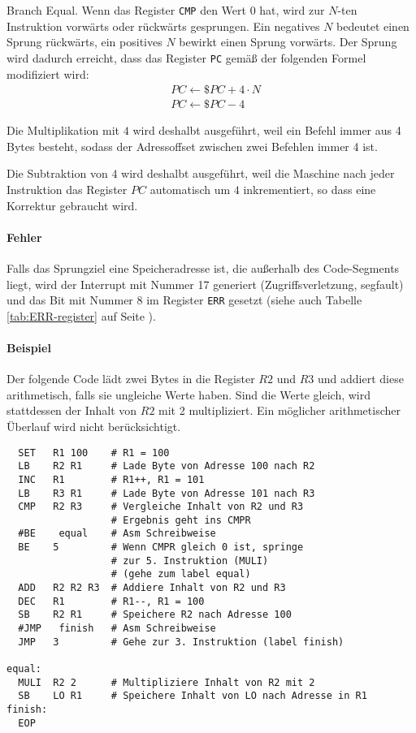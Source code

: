 \glqq Branch Equal\grqq.
Wenn das Register \texttt{CMP} den Wert $0$ hat, wird zur $N$-ten Instruktion
vorwärts oder rückwärts gesprungen. Ein negatives $N$ bedeutet einen Sprung
rückwärts, ein positives $N$ bewirkt einen Sprung vorwärts. Der Sprung wird
dadurch erreicht, dass das Register \texttt{PC} gemäß der folgenden Formel
modifiziert wird:
\begin{align*}
   & PC \gets \$PC + 4 \cdot N \\
   & PC \gets \$PC - 4
\end{align*}

Die Multiplikation mit $4$ wird deshalbt ausgeführt, weil ein Befehl immer aus 4
Bytes besteht, sodass der Adressoffset zwischen zwei Befehlen immer 4 ist.

Die Subtraktion von $4$ wird deshalbt ausgeführt, weil die Maschine nach jeder
Instruktion das Register $PC$ automatisch um $4$ inkrementiert, so dass eine
Korrektur gebraucht wird.

\paragraph{Fehler}
Falls das Sprungziel eine Speicheradresse ist, die außerhalb des Code-Segments
liegt, wird der Interrupt mit Nummer 17 generiert (Zugriffsverletzung, segfault)
und das Bit mit Nummer 8 im Register \texttt{ERR} gesetzt (siehe auch Tabelle
\ref{tab:ERR-register} auf Seite \pageref{tab:ERR-register}).


\paragraph{Beispiel}
Der folgende Code lädt zwei Bytes in die Register $R2$ und $R3$ und addiert
diese arithmetisch, falls sie ungleiche Werte haben. Sind die Werte gleich,
wird stattdessen der Inhalt von $R2$ mit 2 multipliziert. Ein möglicher
arithmetischer Überlauf wird nicht berücksichtigt.
\begin{lstlisting}
  SET   R1 100    # R1 = 100
  LB    R2 R1     # Lade Byte von Adresse 100 nach R2
  INC   R1        # R1++, R1 = 101
  LB    R3 R1     # Lade Byte von Adresse 101 nach R3
  CMP   R2 R3     # Vergleiche Inhalt von R2 und R3
                  # Ergebnis geht ins CMPR
  #BE    equal    # Asm Schreibweise
  BE    5         # Wenn CMPR gleich 0 ist, springe
                  # zur 5. Instruktion (MULI)
                  # (gehe zum label equal)
  ADD   R2 R2 R3  # Addiere Inhalt von R2 und R3
  DEC   R1        # R1--, R1 = 100
  SB    R2 R1     # Speichere R2 nach Adresse 100
  #JMP   finish   # Asm Schreibweise
  JMP   3         # Gehe zur 3. Instruktion (label finish)

equal:
  MULI  R2 2      # Multipliziere Inhalt von R2 mit 2
  SB    LO R1     # Speichere Inhalt von LO nach Adresse in R1
finish:
  EOP
\end{lstlisting}



